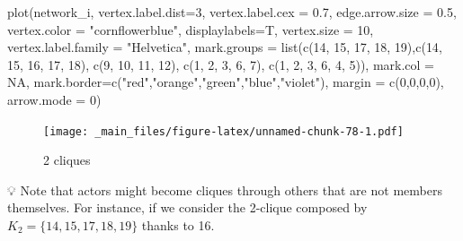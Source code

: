 \documentclass[
  notitlepage,
  onecolumn,
  openany]{book}
\newenvironment{Shaded}{\begin{snugshade}}{\end{snugshade}}
\newcommand{\AttributeTok}[1]{\textcolor[rgb]{0.77,0.63,0.00}{#1}}
\newcommand{\ConstantTok}[1]{\textcolor[rgb]{0.00,0.00,0.00}{#1}}
\newcommand{\DecValTok}[1]{\textcolor[rgb]{0.00,0.00,0.81}{#1}}
\newcommand{\FloatTok}[1]{\textcolor[rgb]{0.00,0.00,0.81}{#1}}
\newcommand{\FunctionTok}[1]{\textcolor[rgb]{0.00,0.00,0.00}{#1}}
\newcommand{\NormalTok}[1]{#1}
\newcommand{\StringTok}[1]{\textcolor[rgb]{0.31,0.60,0.02}{#1}}
\begin{document}
\begin{Shaded}
\begin{Highlighting}[]
\FunctionTok{plot}\NormalTok{(network\_i,}
     \AttributeTok{vertex.label.dist=}\DecValTok{3}\NormalTok{,}
     \AttributeTok{vertex.label.cex =} \FloatTok{0.7}\NormalTok{,}
     \AttributeTok{edge.arrow.size =} \FloatTok{0.5}\NormalTok{,}
     \AttributeTok{vertex.color =} \StringTok{"cornflowerblue"}\NormalTok{,}
     \AttributeTok{displaylabels=}\NormalTok{T,}
     \AttributeTok{vertex.size =} \DecValTok{10}\NormalTok{,}
     \AttributeTok{vertex.label.family =} \StringTok{"Helvetica"}\NormalTok{,}
     \AttributeTok{mark.groups =} \FunctionTok{list}\NormalTok{(}\FunctionTok{c}\NormalTok{(}\DecValTok{14}\NormalTok{, }\DecValTok{15}\NormalTok{, }\DecValTok{17}\NormalTok{, }\DecValTok{18}\NormalTok{, }\DecValTok{19}\NormalTok{),}\FunctionTok{c}\NormalTok{(}\DecValTok{14}\NormalTok{, }\DecValTok{15}\NormalTok{, }\DecValTok{16}\NormalTok{, }\DecValTok{17}\NormalTok{, }\DecValTok{18}\NormalTok{),}
                        \FunctionTok{c}\NormalTok{(}\DecValTok{9}\NormalTok{, }\DecValTok{10}\NormalTok{, }\DecValTok{11}\NormalTok{, }\DecValTok{12}\NormalTok{), }\FunctionTok{c}\NormalTok{(}\DecValTok{1}\NormalTok{, }\DecValTok{2}\NormalTok{, }\DecValTok{3}\NormalTok{, }\DecValTok{6}\NormalTok{, }\DecValTok{7}\NormalTok{), }\FunctionTok{c}\NormalTok{(}\DecValTok{1}\NormalTok{, }\DecValTok{2}\NormalTok{, }\DecValTok{3}\NormalTok{, }\DecValTok{6}\NormalTok{, }\DecValTok{4}\NormalTok{, }\DecValTok{5}\NormalTok{)),}
     \AttributeTok{mark.col =} \ConstantTok{NA}\NormalTok{,}
     \AttributeTok{mark.border=}\FunctionTok{c}\NormalTok{(}\StringTok{"red"}\NormalTok{,}\StringTok{"orange"}\NormalTok{,}\StringTok{"green"}\NormalTok{,}\StringTok{"blue"}\NormalTok{,}\StringTok{"violet"}\NormalTok{),}
     \AttributeTok{margin =} \FunctionTok{c}\NormalTok{(}\DecValTok{0}\NormalTok{,}\DecValTok{0}\NormalTok{,}\DecValTok{0}\NormalTok{,}\DecValTok{0}\NormalTok{),}
     \AttributeTok{arrow.mode =} \DecValTok{0}\NormalTok{)}
\end{Highlighting}
\end{Shaded}

\begin{figure}
\centering
\texttt{[image: \_main\_files/figure-latex/unnamed-chunk-78-1.pdf]}
\caption{\label{fig:unnamed-chunk-78}2 cliques}
\end{figure}

💡 Note that actors might become cliques through others that are not members themselves. For instance, if we consider the 2-clique composed by \(K_2 = \{14,15,17,18,19\}\) thanks to 16.
\end{document}

